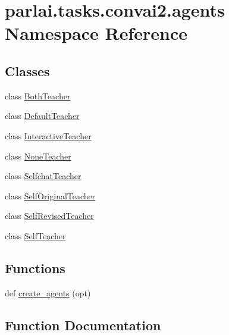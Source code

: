 \hypertarget{namespaceparlai_1_1tasks_1_1convai2_1_1agents}{}\section{parlai.\+tasks.\+convai2.\+agents Namespace Reference}
\label{namespaceparlai_1_1tasks_1_1convai2_1_1agents}
\subsection*{Classes}
\begin{DoxyCompactItemize}
\item 
class \hyperlink{classparlai_1_1tasks_1_1convai2_1_1agents_1_1BothTeacher}{Both\+Teacher}
\item 
class \hyperlink{classparlai_1_1tasks_1_1convai2_1_1agents_1_1DefaultTeacher}{Default\+Teacher}
\item 
class \hyperlink{classparlai_1_1tasks_1_1convai2_1_1agents_1_1InteractiveTeacher}{Interactive\+Teacher}
\item 
class \hyperlink{classparlai_1_1tasks_1_1convai2_1_1agents_1_1NoneTeacher}{None\+Teacher}
\item 
class \hyperlink{classparlai_1_1tasks_1_1convai2_1_1agents_1_1SelfchatTeacher}{Selfchat\+Teacher}
\item 
class \hyperlink{classparlai_1_1tasks_1_1convai2_1_1agents_1_1SelfOriginalTeacher}{Self\+Original\+Teacher}
\item 
class \hyperlink{classparlai_1_1tasks_1_1convai2_1_1agents_1_1SelfRevisedTeacher}{Self\+Revised\+Teacher}
\item 
class \hyperlink{classparlai_1_1tasks_1_1convai2_1_1agents_1_1SelfTeacher}{Self\+Teacher}
\end{DoxyCompactItemize}
\subsection*{Functions}
\begin{DoxyCompactItemize}
\item 
def \hyperlink{namespaceparlai_1_1tasks_1_1convai2_1_1agents_a8f4cd6ce4399459abbc39bc24ce74780}{create\+\_\+agents} (opt)
\end{DoxyCompactItemize}


\subsection{Function Documentation}
\mbox{\label{namespaceparlai_1_1tasks_1_1convai2_1_1agents_a8f4cd6ce4399459abbc39bc24ce74780}} 
